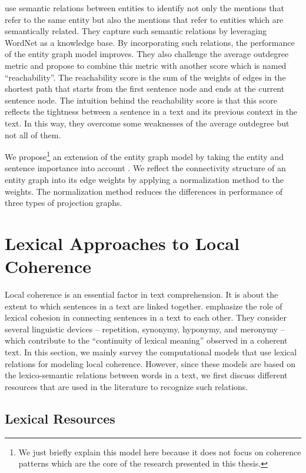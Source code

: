  use semantic relations between entities to identify not only the mentions that refer to the same entity but also the mentions that refer to entities which are semantically related.   
They capture such semantic relations by leveraging WordNet \cite{baccianella10} as a knowledge base. 
By incorporating such relations, the performance of the entity graph model improves.  
They also challenge the average outdegree metric and propose to combine this metric with another score which is named ``reachability''. 
The reachability score is the sum of the weights of edges in the shortest path that starts from the first sentence node and ends at the current sentence node. 
The intuition behind the reachability score is that this score reflects the tightness between a sentence in a text and its previous context in the text. 
In this way, they overcome some weaknesses of the average outdegree but not all of them.    

We propose\footnote{We just briefly explain this model here because it does not focus on coherence patterns which are the core of the research presented in this thesis.} an extension of the entity graph model by taking the entity and sentence importance into account \cite{mesgar14}. 
We reflect the connectivity structure of an entity graph into its edge weights by applying a normalization method to the weights.  
The normalization method reduces the differences in performance of three types of projection graphs. 

\section{Lexical Approaches to Local Coherence}

Local coherence is an essential factor in text comprehension.
It is about the extent to which sentences in a text are linked together. 
 emphasize the role of lexical cohesion in connecting sentences in a text to each other. 
They consider several linguistic devices -- repetition, synonymy, hyponymy, and meronymy --  which contribute to the ``continuity of lexical meaning'' observed in a coherent text.   
In this section, we mainly survey the computational models that use lexical relations for modeling local coherence. 
However, since these models are based on the lexico-semantic relations between words in a text, we first discuss different resources that are used in the literature to recognize such relations. 

\subsection{Lexical Resources} 

